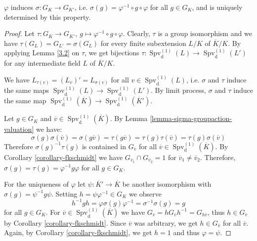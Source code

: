 \begin{step}
$\varphi$ induces $\sigma:G_K\to G_{K'}$, i.e. $\sigma(g) = \varphi^{-1}\circ g\circ \varphi$ for all $g\in G_K$, and is uniquely determined by this property.
\end{step}

\begin{proof}
Let $\tau:G_K\to G_{K'},\ g\mapsto \varphi^{-1}\circ g\circ \varphi$. Clearly, $\tau$ is a group isomorphism and we have $\tau(G_L)=G_{L'}=\sigma(G_L)$ for every finite subextension $L/K$ of $\overline{K}/K$. By applying Lemma \ref{3.2} on $\tau$, we get bijections $\tau: \operatorname{Spv}_\text{d}^{(1)}(L)\to \operatorname{Spv}_\text{d}^{(1)}(L')$ for any intermediate field $L$ of $\overline{K}/K$.

We have $L_{\tau(v)} = (L_v)' = L_{\sigma(v)}$ for all $v\in\operatorname{Spv}_\text{d}^{(1)}(L)$, i.e. $\sigma$ and $\tau$ induce the same maps $\operatorname{Spv}_\text{d}^{(1)}(L)\to \operatorname{Spv}_\text{d}^{(1)}(L')$. By limit process, $\sigma$ and $\tau$ induce the same map $\operatorname{Spv}_\text{d}^{(1)}(\overline{K})\to \operatorname{Spv}_\text{d}^{(1)}(\overline{K}')$.

Let $g\in G_K$ and $\overline{v}\in\operatorname{Spv}_\text{d}^{(1)}(\overline{K})$. By Lemma \ref{lemma-sigma-groupaction-valuation} we have:
\[ \sigma(g)\sigma(\overline{v}) = \sigma(g\overline{v}) = \tau(g\overline{v}) = \tau(g)\tau(\overline{v}) = \tau(g) \sigma(\overline{v}) \]
Therefore $\sigma(g)^{-1}\tau(g)$ is contained in $G_{\overline{v}}$ for all $\overline{v}\in\operatorname{Spv}_\text{d}^{(1)}(\overline{K})$. By Corollary \ref{corollary-fkschmidt} we have $G_{\overline{v}_1}\cap G_{\overline{v}_2} = 1$ for $\overline{v}_1\neq\overline{v}_2$. Therefore, $\sigma(g) = \tau(g) = \varphi^{-1}g\varphi$ for all $g\in G_K$.

For the uniqueness of $\varphi$ let $\psi: \overline{K}'\to \overline{K}$ be another isomorphism with $\sigma(g) = \psi^{-1} g \psi$. Setting $h = \psi\varphi^{-1}\in G_K$ we observe
\[ h^{-1}gh = \varphi\sigma(g)\varphi^{-1} = \sigma^{-1}\sigma(g) = g \]
for all $g\in G_K$. For $\overline{v}\in\operatorname{Spv}_\text{d}^{(1)}(\overline{K})$ we have $G_{\overline{v}} = h G_{\overline{v}} h^{-1} = G_{h\overline{v}}$, thus $h\in G_{\overline{v}}$ by Corollary \ref{corollary-fkschmidt}. Since $\overline{v}$ was arbitrary, we get $h\in G_{\overline{v}}$ for all $\overline{v}$. Again, by Corollary \ref{corollary-fkschmidt}, we get $h=1$ and thus $\varphi = \psi$.
\end{proof}
